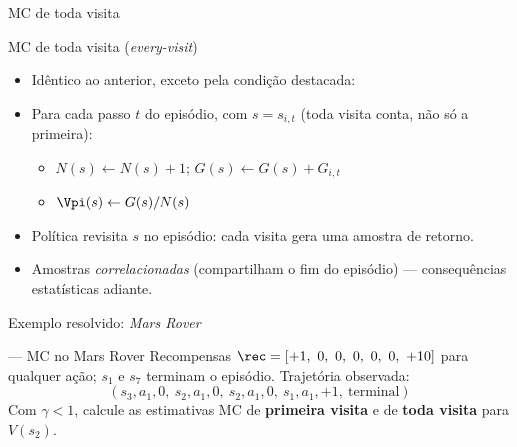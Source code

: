 \documentclass[aspectratio=169, 11pt]{beamer}
\begin{document}
\begin{frame}{MC de toda visita}
  \begin{algbox}{MC de toda visita (\emph{every-visit})}
    \begin{itemize}\setlength{\itemsep}{0.2ex}
      \item Idêntico ao anterior, exceto pela condição destacada:
      \item Para cada passo $t$ do episódio, com $s = s_{i,t}$
        (\alert{toda} visita conta, não só a primeira):
      \begin{itemize}
        \item $N(s) \leftarrow N(s) + 1$; \quad $G(s) \leftarrow G(s) + G_{i,t}$
        \item $\Vpi(s) \leftarrow G(s)/N(s)$
      \end{itemize}
    \end{itemize}
  \end{algbox}

  \begin{itemize}
    \item Política revisita $s$ no episódio: cada visita gera uma amostra
      de retorno.
    \item Amostras \emph{correlacionadas} (compartilham o fim do episódio) —
      consequências estatísticas adiante.
  \end{itemize}
\end{frame}

\begin{frame}{Exemplo resolvido: \emph{Mars Rover}}
  \centering

  \medskip
  \begin{exbox}{— MC no Mars Rover}
    Recompensas $\rec = [+1,\ 0,\ 0,\ 0,\ 0,\ 0,\ +10]$ para qualquer ação;
    $s_1$ e $s_7$ terminam o episódio. Trajetória observada:
    \[
      (s_3, a_1, 0,\ s_2, a_1, 0,\ s_2, a_1, 0,\ s_1, a_1, +1,\ \text{terminal})
    \]
    Com $\gamma < 1$, calcule as estimativas MC de \textbf{primeira visita}
    e de \textbf{toda visita} para $V(s_2)$.
  \end{exbox}
\end{frame}
\end{document}
